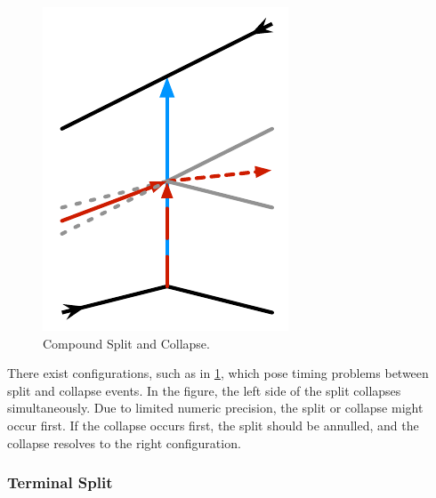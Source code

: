 \documentclass[12pt,a4paper,oneside,openany]{article}
\begin{document}
\begin{figure}[htpb]
\begin{center}
\includegraphics[scale=0.6667]{fig-compound-split-collapse.pdf}
\caption{Compound Split and Collapse.}
\label{fig:compoundcollapse}
\end{center}
\end{figure}


There exist configurations, such as in \cref{fig:compoundcollapse}, which pose timing problems between split and collapse events. In the figure, the left side of the split collapses simultaneously. Due to limited numeric precision, the split or collapse might occur first. If the collapse occurs first, the split should be annulled, and the collapse resolves to the right configuration.

\subsubsection{Terminal Split}
\end{document}
